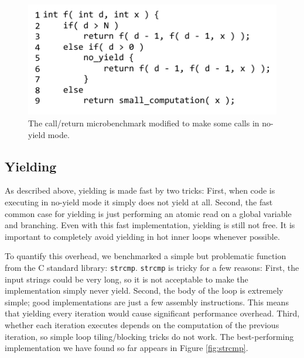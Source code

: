 \documentclass[pldi,10pt,preprint]{sigplanconf-pldi16}
\begin{document}
\begin{figure}
\includegraphics{just_calling_n_benchmark}
\caption{The call/return microbenchmark modified to make some calls in no-yield mode.}
\label{fig:micro_calling_n}
\end{figure}

\subsection{Yielding}

As described above, yielding is made fast by two tricks:
First, when code is executing in no-yield mode it simply does not yield at all.
Second, the fast common case for yielding is just performing an atomic read on a global variable and branching.
Even with this fast implementation, yielding is still not free.
It is important to completely avoid yielding in hot inner loops whenever possible.

To quantify this overhead, we benchmarked a simple but problematic function from the C standard library: \texttt{strcmp}.
\texttt{strcmp} is tricky for a few reasons:
First, the input strings could be very long, so it is not acceptable to make the implementation simply never yield.
Second, the body of the loop is extremely simple; good implementations are just a few assembly instructions.
This means that yielding every iteration would cause significant performance overhead.
Third, whether each iteration executes depends on the computation of the previous iteration, so simple loop tiling/blocking tricks do not work.
The best-performing implementation we have found so far appears in Figure \ref{fig:strcmp}.
\end{document}
